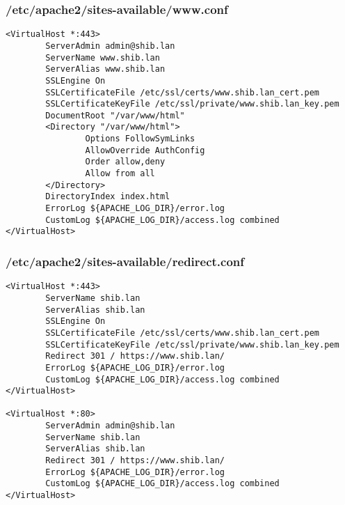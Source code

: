 \subsubsection{/etc/apache2/sites-available/www.conf}
\begin{lstlisting}
<VirtualHost *:443>
        ServerAdmin admin@shib.lan
        ServerName www.shib.lan
        ServerAlias www.shib.lan 
        SSLEngine On
        SSLCertificateFile /etc/ssl/certs/www.shib.lan_cert.pem
        SSLCertificateKeyFile /etc/ssl/private/www.shib.lan_key.pem
        DocumentRoot "/var/www/html"
        <Directory "/var/www/html">
                Options FollowSymLinks
                AllowOverride AuthConfig
                Order allow,deny
                Allow from all
        </Directory>
        DirectoryIndex index.html
        ErrorLog ${APACHE_LOG_DIR}/error.log
        CustomLog ${APACHE_LOG_DIR}/access.log combined
</VirtualHost>
\end{lstlisting}

\subsubsection{/etc/apache2/sites-available/redirect.conf}
\begin{lstlisting}
<VirtualHost *:443>
        ServerName shib.lan
        ServerAlias shib.lan 
        SSLEngine On
        SSLCertificateFile /etc/ssl/certs/www.shib.lan_cert.pem
        SSLCertificateKeyFile /etc/ssl/private/www.shib.lan_key.pem
        Redirect 301 / https://www.shib.lan/
        ErrorLog ${APACHE_LOG_DIR}/error.log
        CustomLog ${APACHE_LOG_DIR}/access.log combined
</VirtualHost>

<VirtualHost *:80>
        ServerAdmin admin@shib.lan
        ServerName shib.lan
        ServerAlias shib.lan 
        Redirect 301 / https://www.shib.lan/
        ErrorLog ${APACHE_LOG_DIR}/error.log
        CustomLog ${APACHE_LOG_DIR}/access.log combined
</VirtualHost>
\end{lstlisting}


